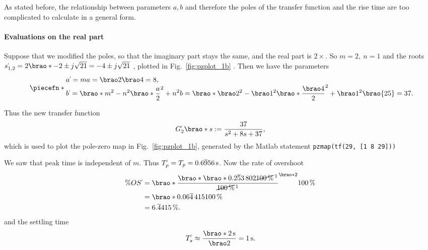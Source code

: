 \documentclass[12pt]{article}
\newcommand*\siexpr[2][]{\SI[parse-numbers=false,#1]{#2}}%
\DeclarePairedDelimiter\brao()%
\DeclarePairedDelimiter\piecefn\{.
\newcommand{\setprime}[2][1]{%
    {#2}^{%
        \raisebox{1pt}{%
            \scalebox{0.5}{%
                \itshape\sffamily\uppercase%
                \expandafter{%
                    \romannumeral#1%
                }%
            }%
        }
    }%
}%
\begin{document}
\begin{enumerate}[(a)]
        As stated before, the relationship between parameters $a, b$ and therefore the poles of the transfer function and the rise time are too complicated to calculate in a general form.

        \paragraph{Evaluations on the real part}

        Suppose that we modified the poles, so that the imaginary part stays the same, and the real part is $2\times$.
        So $m = 2,\ n = 1$
        and the roots $\setprime{s}_{1,2} = 2\brao*{-2} \pm j\sqrt{21} = -4 \pm j\sqrt{21}$%
        , plotted in Fig.~\ref{fig:pzplot_1b}%
        .
        Then we have the parameters
        \begin{equation}
            \piecefn*{
                \begin{array}{@{}l@{}}\displaystyle
                    \setprime{a} = ma = \brao2\brao4 = 8,
                \\*\displaystyle
                      \setprime{b}
                    = \brao*{m^2 - n^2}\brao*{\frac{a}2}^2 + n^2b
                    = \brao*{\brao2^2 - \brao1^2}\brao*{\frac{\brao4}2}^2 + \brao1^2\brao{25}
                    = 37\rlap.
                \end{array}
            }
        \end{equation}

        Thus the new transfer function
        \begin{equation}
            \setprime{G}_2\brao*s := \frac{37}{s^2 + 8s + 37},
        \end{equation}
        which is used to plot the pole-zero map in Fig.~\ref{fig:pzplot_1b}, generated by the Matlab statement \texttt{pzmap(tf(29, [1 8 29]))}

        We saw that peak time is independent of $m$.
        Thus $\setprime{T}_p = T_p = \siexpr{0.6\overline956}\second$. Now
        the rate of overshoot
        \begin{equation}
            \begin{aligned}
                  \%\setprime{OS}
                &{}= \brao*{\frac{\brao*{\brao*{0.2\overline53\,802}\cancel{{\SI{100}\percent}}^{\,1}}}{\cancel{\SI{100}\percent}^{\,1}}}^{\brao*{2}} \SI{100}\percent
            \\*
                &{}= \brao*{0.06\overline4\,415} \SI{100}\percent
            \\*
                &{}= \siexpr{6.\overline4415}\percent.
            \\*
            \end{aligned}
        \end{equation}
        and the settling time
        \begin{equation}
            \setprime{T}_s
            \approx \frac{\brao*{\SI2\second}}{\brao2}
            = \SI1\second.
        \end{equation}


\end{enumerate}
\end{document}
